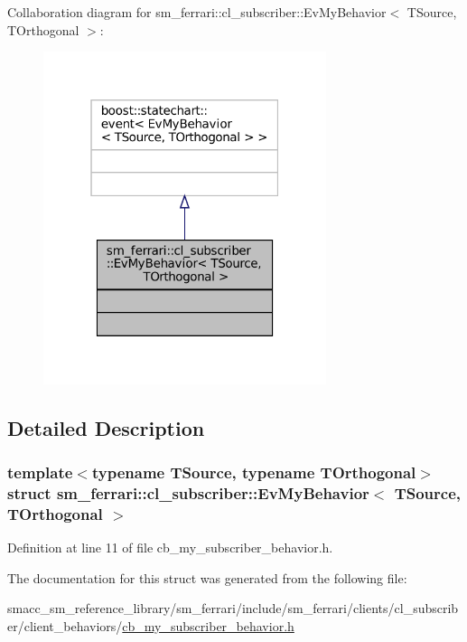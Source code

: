 Collaboration diagram for sm\+\_\+ferrari\+:\+:cl\+\_\+subscriber\+:\+:Ev\+My\+Behavior$<$ T\+Source, T\+Orthogonal $>$\+:
\nopagebreak
\begin{figure}[H]
\begin{center}
\leavevmode
\includegraphics[width=235pt]{structsm__ferrari_1_1cl__subscriber_1_1EvMyBehavior__coll__graph}
\end{center}
\end{figure}


\subsection{Detailed Description}
\subsubsection*{template$<$typename T\+Source, typename T\+Orthogonal$>$\newline
struct sm\+\_\+ferrari\+::cl\+\_\+subscriber\+::\+Ev\+My\+Behavior$<$ T\+Source, T\+Orthogonal $>$}



Definition at line 11 of file cb\+\_\+my\+\_\+subscriber\+\_\+behavior.\+h.



The documentation for this struct was generated from the following file\+:\begin{DoxyCompactItemize}
\item 
smacc\+\_\+sm\+\_\+reference\+\_\+library/sm\+\_\+ferrari/include/sm\+\_\+ferrari/clients/cl\+\_\+subscriber/client\+\_\+behaviors/\hyperlink{cb__my__subscriber__behavior_8h}{cb\+\_\+my\+\_\+subscriber\+\_\+behavior.\+h}\end{DoxyCompactItemize}
